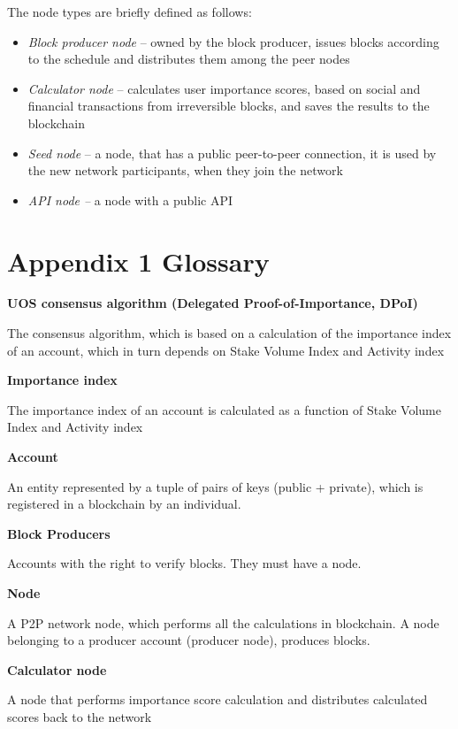 \documentclass[a4paper,12pt]{article}
\begin{document}
The node types are briefly defined as follows:
\begin{itemize}
\item \emph{Block producer node} -- owned by the block producer, issues blocks according to the schedule and distributes them among the peer nodes
\item \emph{Calculator node} -- calculates user importance scores, based on social and financial transactions from irreversible blocks, and saves the results to the blockchain
\item \emph{Seed node} -- a node, that has a public peer-to-peer connection, it is used by the new network participants, when they join the network
\item \emph{API node --} a node with a public API
\end{itemize}



\section*{Appendix 1 Glossary}
\textbf{U{\degree}OS consensus algorithm (Delegated Proof-of-Importance, DPoI)}

The consensus algorithm, which is based on a calculation of the importance index of an account, which in turn depends on Stake Volume Index and Activity index

\textbf{Importance index}

The importance index of an account is calculated as a function of Stake Volume Index and Activity index

\textbf{Account}

An entity represented by a tuple of pairs of keys (public + private), which is registered in a blockchain by an individual.

\textbf{Block Producers}

Accounts with the right to verify blocks. They must have a node.

\textbf{Node}

A P2P network node, which performs all the calculations in blockchain. A node belonging to a producer account (producer node), produces blocks.

\textbf{Calculator node} 

A node that performs importance score calculation and distributes calculated scores back to the network
\end{document}

